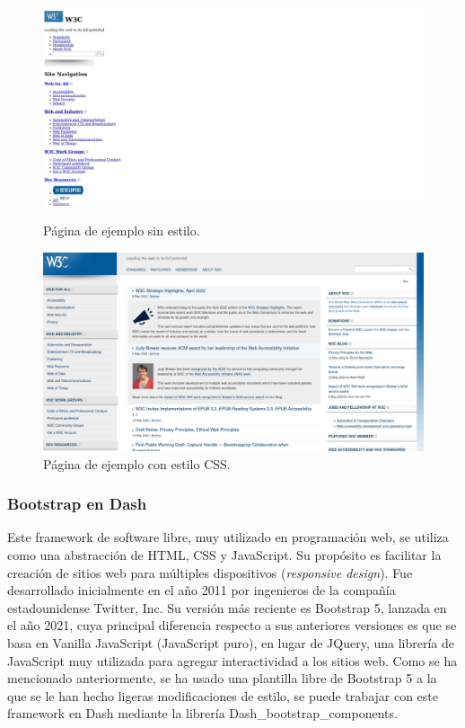 \documentclass[a4paper, 12pt, oneside]{book}
\begin{document}
\begin{figure}[H]
  \centering
  \begin{minipage}[b]{0.4\textwidth}
    \includegraphics[width=\textwidth]{img/w3c_sin_css}
    \caption{Página de ejemplo sin estilo.}
    \label{figura:w3c_sin_css}
  \end{minipage}
  \hfill
  \begin{minipage}[b]{0.4\textwidth}
    \includegraphics[width=\textwidth]{img/w3c_con_css}
    \caption{Página de ejemplo con estilo CSS.}
    \label{figura:w3c_con_css}
  \end{minipage}
\end{figure}

\subsubsection{Bootstrap en Dash}
\label{subsubsec:boostrap}
Este framework de software libre, muy utilizado en programación web, se utiliza como una abstracción de HTML, CSS y JavaScript. Su propósito es facilitar la creación de sitios web para múltiples dispositivos (\textit{responsive design}). Fue desarrollado inicialmente en el año 2011 por ingenieros de la compañía estadounidense Twitter, Inc. Su versión más reciente es Bootstrap 5, lanzada en el año 2021, cuya principal diferencia respecto a sus anteriores versiones es que se basa en Vanilla JavaScript (JavaScript puro), en lugar de JQuery, una librería de JavaScript muy utilizada para agregar interactividad a los sitios web.
Como se ha mencionado anteriormente, se ha usado una plantilla libre de Bootstrap 5 a la que se le han hecho ligeras modificaciones de estilo, se puede trabajar con este framework en Dash mediante la librería Dash\_bootstrap\_components.
\end{document}
